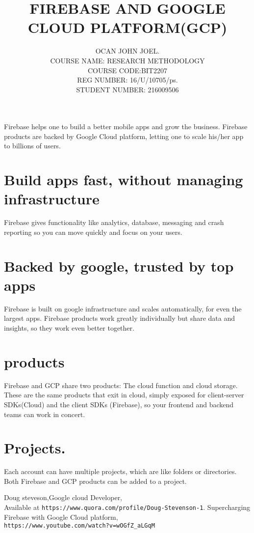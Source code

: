 \documentclass[12pt,a4paper]{article}
\begin{document}
\title{FIREBASE AND GOOGLE CLOUD PLATFORM(GCP)}
\author{OCAN JOHN JOEL.\\
COURSE NAME: RESEARCH METHODOLOGY\\
   COURSE CODE:BIT2207\\
    REG NUMBER: 16/U/10705/ps.\\
      STUDENT NUMBER: 216009506\\}
\maketitle   
   Firebase helps one to build a better mobile apps and grow the business. Firebase products are backed by Google Cloud platform, letting one to scale his/her app to billions of users.
\section{Build apps fast, without managing infrastructure}
Firebase gives functionality like analytics, database, messaging and crash reporting so you can move quickly and focus on your users.
\section{Backed by google, trusted by top apps}
  Firebase is built on google infrastructure and scales automatically, for even the largest apps.
Firebase products work greatly individually but share data and insights, so they work even better together.
\section{products}
Firebase and GCP share two products: 
The cloud function and cloud storage. These are the same products that exit in cloud, simply exposed for client-server SDKs(Cloud) and the client SDKs (Firebase), so your frontend and backend teams can work in concert.
\section{Projects.}
Each account can have multiple projects, which are like folders or directories. Both Firebase and GCP products can be added to a project.

\begin{thebibliography}{100}

Doug steveson,Google cloud Developer,\\
Available at \texttt{https://www.quora.com/profile/Doug-Stevenson-1}.
Supercharging Firebase with Google Cloud platform,\\
\texttt{https://www.youtube.com/watch?v=wOGfZ_aLGqM }
\end{thebibliography}
\end{document}
